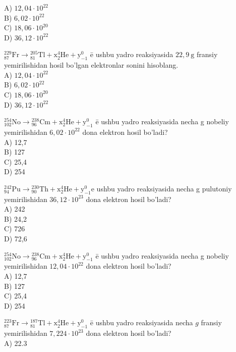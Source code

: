 A) $12,04 \cdot 10^{22}$\\
B) $6,02 \cdot 10^{22}$\\
C) $18,06 \cdot 10^{20}$\\
D) $36,12 \cdot 10^{22}$
  \item ${ }_{87}^{229} \mathrm{Fr} \rightarrow{ }_{81}^{205} \mathrm{Tl}+\mathrm{x}_{2}^{4} \mathrm{He}+\mathrm{y}_{-1}^{0}$ ē ushbu yadro reaksiyasida $22,9 \mathrm{~g}$ fransiy yemirilishidan hosil bo'lgan elektronlar sonini hisoblang.\\
A) $12,04 \cdot 10^{22}$\\
B) $6,02 \cdot 10^{22}$\\
C) $18,06 \cdot 10^{20}$\\
D) $36,12 \cdot 10^{22}$
  \item ${ }_{102}^{254} \mathrm{No} \rightarrow{ }_{96}^{238} \mathrm{Cm}+\mathrm{x}_{2}^{4} \mathrm{He}+\mathrm{y}_{-1}^{0}$ ē ushbu yadro reaksiyasida necha g nobeliy yemirilishidan $6,02 \cdot 10^{22}$ dona elektron hosil bo'ladi?\\
A) 12,7\\
B) 127\\
C) 25,4\\
D) 254
  \item ${ }_{94}^{242} \mathrm{Pu} \rightarrow{ }_{90}^{230} \mathrm{Th}+\mathrm{x}_{2}^{4} \mathrm{He}+\mathrm{y}_{-1}^{0} \mathrm{e}$ ushbu yadro reaksiyasida necha g pulutoniy yemirilishidan $36,12 \cdot 10^{23}$ dona elektron hosil bo'ladi?\\
A) 242\\
B) 24,2\\
C) 726\\
D) 72,6
  \item ${ }_{102}^{254} \mathrm{No} \rightarrow{ }_{96}^{238} \mathrm{Cm}+\mathrm{x}_{2}^{4} \mathrm{He}+\mathrm{y}_{-1}^{0}$ ē ushbu yadro reaksiyasida necha g nobeliy yemirilishidan $12,04 \cdot 10^{22}$ dona elektron hosil bo'ladi?\\
A) 12,7\\
B) 127\\
C) 25,4\\
D) 254
  \item ${ }_{87}^{223} \mathrm{Fr} \rightarrow{ }_{81}^{187} \mathrm{Tl}+\mathrm{x}_{2}^{4} \mathrm{He}+\mathrm{y}_{-1}^{0}$ ē ushbu yadro reaksiyasida necha $g$ fransiy\\
yemirilishidan $7,224 \cdot 10^{23}$ dona elektron hosil bo'ladi?\\
A) 22.3\\
